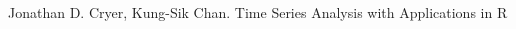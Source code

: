 \documentclass{article}
\begin{document}
				
				
				
				
				\begin{thebibliography}{99}
					 Jonathan D. Cryer, Kung-Sik Chan. Time Series Analysis with Applications in R
					
				
					
				\end{thebibliography}
				
				
				
				
			
\end{document}
